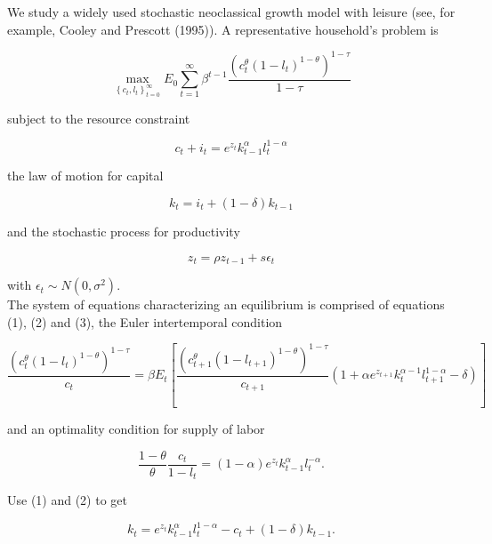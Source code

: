 \documentclass[12pt]{article}
\begin{document}
We study a widely used stochastic neoclassical growth model with leisure (see, for example, Cooley and Prescott (1995)). A representative household's problem is

$$
\max _{\left\{c_{t}, l_{t}\right\}_{t=0}^{\infty}} E_{0} \sum_{t=1}^{\infty} \beta^{t-1} \frac{\left(c_{t}^{\theta}\left(1-l_{t}\right)^{1-\theta}\right)^{1-\tau}}{1-\tau}
$$

subject to the resource constraint


\begin{equation*}
c_{t}+i_{t}=e^{z_{t}} k_{t-1}^{\alpha} l_{t}^{1-\alpha} \tag{1}
\end{equation*}


the law of motion for capital


\begin{equation*}
k_{t}=i_{t}+(1-\delta) k_{t-1} \tag{2}
\end{equation*}


and the stochastic process for productivity


\begin{equation*}
z_{t}=\rho z_{t-1}+s \epsilon_{t} \tag{3}
\end{equation*}


with $\epsilon_{t} \sim N\left(0, \sigma^{2}\right)$.\\
The system of equations characterizing an equilibrium is comprised of equations (1), (2) and (3), the Euler intertemporal condition


\begin{equation*}
\frac{\left(c_{t}^{\theta}\left(1-l_{t}\right)^{1-\theta}\right)^{1-\tau}}{c_{t}}=\beta E_{t}\left[\frac{\left(c_{t+1}^{\theta}\left(1-l_{t+1}\right)^{1-\theta}\right)^{1-\tau}}{c_{t+1}}\left(1+\alpha e^{z_{t+1}} k_{t}^{\alpha-1} l_{t+1}^{1-\alpha}-\delta\right)\right] \tag{4}
\end{equation*}


and an optimality condition for supply of labor


\begin{equation*}
\frac{1-\theta}{\theta} \frac{c_{t}}{1-l_{t}}=(1-\alpha) e^{z_{t}} k_{t-1}^{\alpha} l_{t}^{-\alpha} . \tag{5}
\end{equation*}


Use (1) and (2) to get


\begin{equation*}
k_{t}=e^{z_{t}} k_{t-1}^{\alpha} l_{t}^{1-\alpha}-c_{t}+(1-\delta) k_{t-1} . \tag{6}
\end{equation*}
\end{document}
